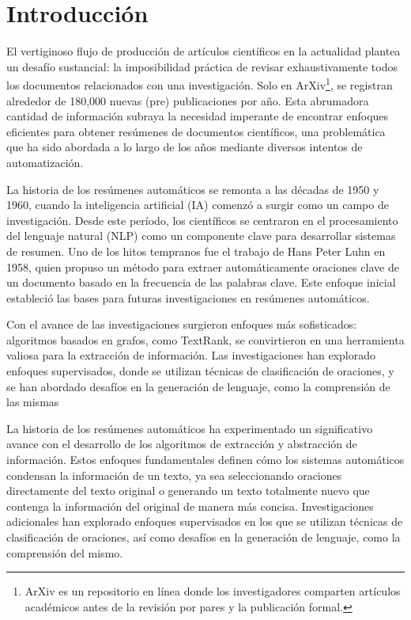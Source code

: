 \chapter*{Introducción}\label{chapter:introduction}

    El vertiginoso flujo de producción de artículos científicos en la actualidad plantea un desafío sustancial: la imposibilidad práctica de revisar exhaustivamente todos los documentos relacionados con una investigación. Solo en ArXiv\footnote{ArXiv es un repositorio en línea donde los investigadores comparten artículos académicos antes de la revisión por pares y la publicación formal.}, se registran alrededor de 180,000 nuevas (pre) publicaciones por año\cite{arxivstats}. Esta abrumadora cantidad de información subraya la necesidad imperante de encontrar enfoques eficientes para obtener resúmenes de documentos científicos, una problemática que ha sido abordada a lo largo de los años mediante diversos intentos de automatización.

    La historia de los resúmenes automáticos se remonta a las décadas de 1950 y 1960, cuando la inteligencia artificial (IA) comenzó a surgir como un campo de investigación. Desde este período, los científicos se centraron en el procesamiento del lenguaje natural (NLP) como un componente clave para desarrollar sistemas de resumen. Uno de los hitos tempranos fue el trabajo de Hans Peter Luhn en 1958\cite{luhun1958}, quien propuso un método para extraer automáticamente oraciones clave de un documento basado en la frecuencia de las palabras clave. Este enfoque inicial estableció las bases para futuras investigaciones en resúmenes automáticos.

    Con el avance de las investigaciones surgieron enfoques más sofisticados: algoritmos basados en grafos, como TextRank\cite{mihalcea2004textrank}, se convirtieron en una herramienta valiosa para la extracción de información. Las investigaciones han explorado enfoques supervisados\cite{collins-etal-2017-supervised}, donde se utilizan técnicas de clasificación de oraciones, y se han abordado desafíos en la generación de lenguaje, como la comprensión de las mismas\cite{knight2000statistics}

    La historia de los resúmenes automáticos ha experimentado un significativo avance con el desarrollo de los algoritmos de extracción y abstracción de información. Estos enfoques fundamentales definen cómo los sistemas automáticos condensan la información de un texto, ya sea seleccionando oraciones directamente del texto original o generando un texto totalmente nuevo que contenga la información del original de manera más concisa. Investigaciones adicionales han explorado enfoques supervisados en los que se utilizan técnicas de clasificación de oraciones\cite{collins-etal-2017-supervised}, así como desafíos en la generación de lenguaje, como la comprensión del mismo\cite{knight2000statistics}.

